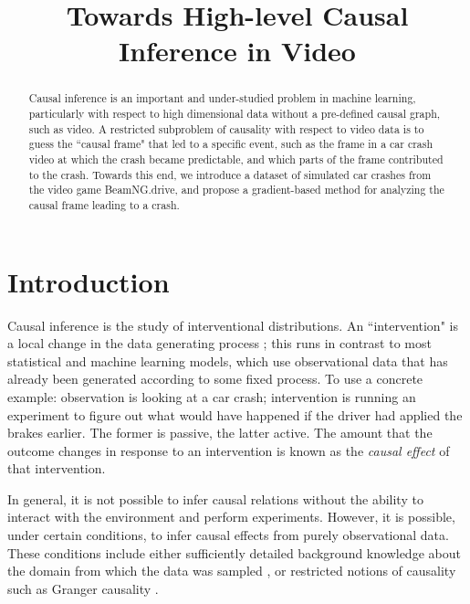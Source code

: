 \documentclass[letterpaper, twocolumn]{article} %
\title{Towards High-level Causal Inference in Video}
\date{}
\begin{document}
\maketitle

\begin{abstract}
Causal inference is an important and under-studied problem in machine learning, particularly with respect to high dimensional data without a pre-defined causal graph, such as video. A restricted subproblem of causality with respect to video data is to guess the ``causal frame" that led to a specific event, such as the frame in a car crash video at which the crash became predictable, and which parts of the frame contributed to the crash. Towards this end, we introduce a dataset of simulated car crashes from the video game BeamNG.drive, and propose a gradient-based method for analyzing the causal frame leading to a crash.
\end{abstract}

\section{Introduction}
\noindent Causal inference is the study of interventional distributions. An ``intervention" is a local change in the data generating process \cite{pearl2009causal}; this runs in contrast to most statistical and machine learning models, which use observational data that has already been generated according to some fixed process. To use a concrete example: observation is looking at a car crash; intervention is running an experiment to figure out what would have happened if the driver had applied the brakes earlier. The former is passive, the latter active. The amount that the outcome changes in response to an intervention is known as the \emph{causal effect} of that intervention.

In general, it is not possible to infer causal relations without the ability to interact with the environment and perform experiments. However, it is possible, under certain conditions, to infer causal effects from purely observational data. These conditions include either sufficiently detailed background knowledge about the domain from which the data was sampled \cite{pearl2009causal} \cite{rosenbaum1983central}, or restricted notions of causality such as Granger causality \cite{granger1969investigating} \cite{granger1980testing}.
\end{document}
